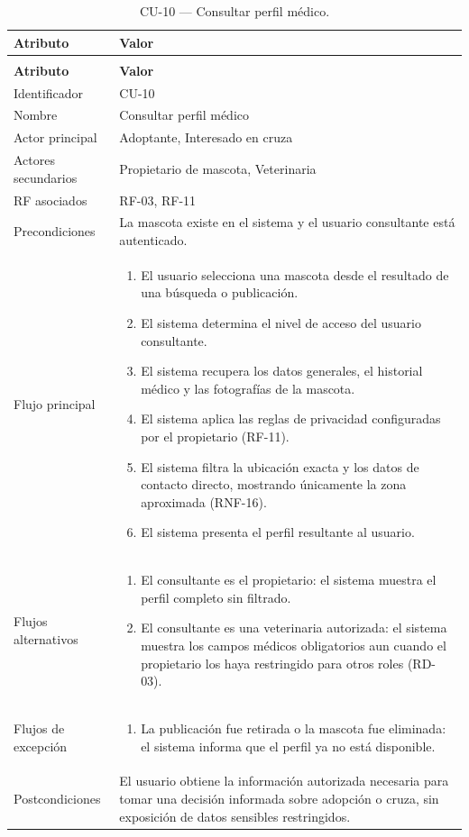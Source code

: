 \documentclass[journal,onecolumn]{IEEEtran}
\makeatletter
\newenvironment{atributos}[2]{%
	\small
	\begin{longtable}{@{}>{\raggedright\arraybackslash}p{4.2cm} >{\raggedright\arraybackslash}p{11.2cm}@{}}
		\caption{#2}\label{tab:#1}\\
		\toprule
		\textbf{Atributo} & \textbf{Valor} \\
		\midrule
		\endfirsthead
		\multicolumn{2}{@{}l}{\small\itshape (continuación)}\\
		\toprule
		\textbf{Atributo} & \textbf{Valor} \\
		\midrule
		\endhead
		\bottomrule
		\endlastfoot
	}{%
	\end{longtable}
	\normalsize
}
\makeatother
\begin{document}
	\begin{atributos}{CU-10}{CU-10 --- Consultar perfil médico.}
		Identificador & CU-10 \\
		Nombre & Consultar perfil médico \\
		Actor principal & Adoptante, Interesado en cruza \\
		Actores secundarios & Propietario de mascota, Veterinaria \\
		RF asociados & RF-03, RF-11 \\
		Precondiciones & La mascota existe en el sistema y el usuario consultante está autenticado. \\
		Flujo principal &
		\begin{enumerate}[leftmargin=*, nosep]
			\item El usuario selecciona una mascota desde el resultado de una búsqueda o publicación.
			\item El sistema determina el nivel de acceso del usuario consultante.
			\item El sistema recupera los datos generales, el historial médico y las fotografías de la mascota.
			\item El sistema aplica las reglas de privacidad configuradas por el propietario (RF-11).
			\item El sistema filtra la ubicación exacta y los datos de contacto directo, mostrando únicamente la zona aproximada (RNF-16).
			\item El sistema presenta el perfil resultante al usuario.
		\end{enumerate} \\
		Flujos alternativos &
		\begin{enumerate}[leftmargin=*, nosep]
			\item[2.1] El consultante es el propietario: el sistema muestra el perfil completo sin filtrado.
			\item[2.2] El consultante es una veterinaria autorizada: el sistema muestra los campos médicos obligatorios aun cuando el propietario los haya restringido para otros roles (RD-03).
		\end{enumerate} \\
		Flujos de excepción &
		\begin{enumerate}[leftmargin=*, nosep]
			\item[3.1] La publicación fue retirada o la mascota fue eliminada: el sistema informa que el perfil ya no está disponible.
		\end{enumerate} \\
		Postcondiciones & El usuario obtiene la información autorizada necesaria para tomar una decisión informada sobre adopción o cruza, sin exposición de datos sensibles restringidos. \\
	\end{atributos}
	
\end{document}
